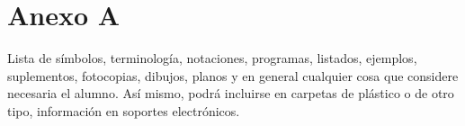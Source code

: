 \chapter{Anexo A}
\label{cap:AnexoA}

Lista de símbolos, terminología, notaciones, programas, listados, ejemplos, suplementos, fotocopias, dibujos, planos y en general cualquier cosa que considere necesaria el alumno. Así mismo, podrá incluirse en carpetas de plástico o de otro tipo, información en soportes electrónicos.